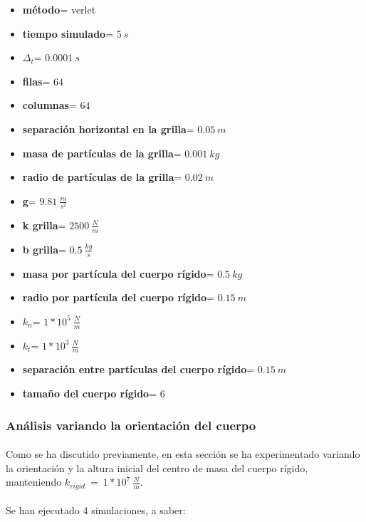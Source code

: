 \documentclass[12pt, twocolumn]{article}
\begin{document}
	\begin{itemize}
        \item \textbf{método}= verlet
        \item \textbf{tiempo simulado}=  $5\:s$
        \item \textbf{$\Delta_{t}$}= $0.0001\:s$
        \item \textbf{filas}= $64$
        \item \textbf{columnas}= $64$
        \item \textbf{separación horizontal en la grilla}= $0.05\:m$
        \item \textbf{masa de partículas de la grilla}= $0.001\:kg$
        \item \textbf{radio de partículas de la grilla}= $0.02\:m$
        \item \textbf{g}= $9.81\:\frac{m}{s^2}$
        \item \textbf{k grilla}= $2500\:\frac{N}{m}$
        \item \textbf{b grilla}= $0.5\:\frac{kg}{s}$
        \item \textbf{masa por partícula del cuerpo rígido}= $0.5\:kg$
        \item \textbf{radio por partícula del cuerpo rígido}= $0.15\:m$
        \item \textbf{$k_{n}$}= $1*10^5\:\frac{N}{m}$
        \item \textbf{$k_{t}$}= $1*10^3\:\frac{N}{m}$
        \item \textbf{separación entre partículas del cuerpo rígido}= $0.15\:m$
        \item \textbf{tamaño del cuerpo rígido}= $6$
	\end{itemize}
	
	\subsubsection{Análisis variando la orientación del cuerpo}
	
	\paragraph{} Como se ha discutido previamente, en esta sección se ha experimentado variando la orientación y la altura inicial del centro de masa del cuerpo rígido, manteniendo $k_{rigid}\:=\:1*10^7\:\frac{N}{m}$.
	
	\paragraph{} Se han ejecutado 4 simulaciones, a saber:
	
\end{document}
